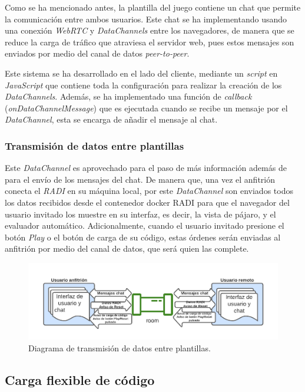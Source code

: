 \documentclass[a4paper, 12pt]{book}
\begin{document}
Como se ha mencionado antes, la plantilla del juego contiene un chat que permite la comunicación entre ambos usuarios. Este chat se ha implementando usando una conexión \emph{WebRTC} y \emph{DataChannels} entre los navegadores, de manera que se reduce la carga de tráfico que atraviesa el servidor web, pues estos mensajes son enviados por medio del canal de datos \emph{peer-to-peer}.

Este sistema se ha desarrollado en el lado del cliente, mediante un \emph{script} en \emph{JavaScript} que contiene toda la configuración para realizar la creación de los \emph{DataChannels}. Además, se ha implementado una función de \emph{callback} (\emph{onDataChannelMessage}) que es ejecutada cuando se recibe un mensaje por el \emph{DataChannel}, esta se encarga de añadir el mensaje al chat.

\subsubsection{Transmisión de datos entre plantillas}

Este \emph{DataChannel} es aprovechado para el paso de más información además de para el envío de los mensajes del chat. De manera que, una vez el anfitrión conecta el \emph{RADI} en su máquina local, por este \emph{DataChannel} son enviados todos los datos recibidos desde el contenedor docker RADI para que el navegador del usuario invitado los muestre en su interfaz, es decir, la vista de pájaro, y el evaluador automático. Adicionalmente, cuando el usuario invitado presione el botón \emph{Play} o el botón de carga de su código, estas órdenes serán enviadas al anfitrión por medio del canal de datos, que será quien las complete.

\begin{figure}[H]
	\centering
    \includegraphics[width=15cm]{img/transmision_datos.png}
    \caption{Diagrama de transmisión de datos entre plantillas.}
    \label{figura:diagrama_conexion_webrtc}
\end{figure}

\subsection{Carga flexible de código}
\end{document}
